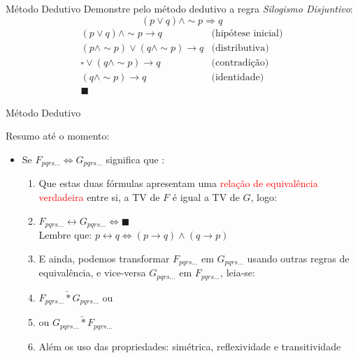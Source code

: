 \begin{frame}[t]{Método Dedutivo}
	Demonstre pelo método dedutivo a regra {\em Silogismo Disjuntivo}: $$(p \vee q) \wedge \sim p \Rightarrow q$$
	\vskip 0.2cm
	$$\begin{array}{cl}
	(p \vee q) \wedge \sim p \rightarrow q & \mbox{(hipótese inicial)} \\
	(p \wedge \sim p) \vee (q \wedge\sim p) \rightarrow q & \mbox{(distributiva)} \\
	\square \vee (q \wedge\sim p) \rightarrow q & \mbox{(contradição)} \\
	(q \wedge\sim p) \rightarrow q & \mbox{(identidade)} \\
	\blacksquare & 
	\end{array}$$
\end{frame}


\begin{frame}[t]{Método Dedutivo}

  Resumo até o momento:
  \begin{itemize}
  	\item Se $F_{pqrs...} \Leftrightarrow G_{pqrs...} $ significa que :
  	
  	\begin{enumerate}
  	
  	\item Que estas duas fórmulas apresentam uma \textcolor{red}{relação de equivalência verdadeira} entre si,
  	      a TV de $F$ é igual a TV de $G$, logo:
  	
  	\item $F_{pqrs...} \leftrightarrow G_{pqrs...} \Leftrightarrow \blacksquare  $\\
  	Lembre que:  $ p \leftrightarrow q \Leftrightarrow (p \rightarrow q ) \wedge  (q \rightarrow p) $
  	  	  	      
  	\item E ainda, podemos transformar   $F_{pqrs...}$ em $G_{pqrs...}$  usando outras regras
  	de equivalência, e vice-versa $G_{pqrs...}$ em $F_{pqrs...}$, leia-se:
  	
  	\item $F_{pqrs...} \underrightarrow{\ast}  G_{pqrs...}$ ou
  	
  	\item ou $G_{pqrs...} \underrightarrow{\ast}  F_{pqrs...}$ 
  	
  	\item Além os uso das propriedades: simétrica, reflexividade e transitividade
  	
  	
  	\end{enumerate}
  	\end{itemize}

  	
\end{frame}


